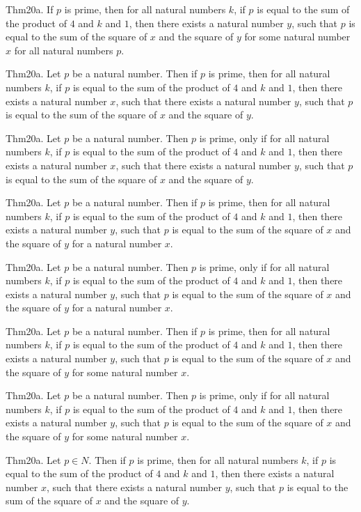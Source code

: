 \documentclass{article}
\begin{document}
Thm20a. If $p$ is prime, then for all natural numbers $k$, if $p$ is equal to the sum of the product of $4$ and $k$ and $1$, then there exists a natural number $y$, such that $p$ is equal to the sum of the square of $x$ and the square of $y$ for some natural number $x$ for all natural numbers $p$.

Thm20a. Let $p$ be a natural number. Then if $p$ is prime, then for all natural numbers $k$, if $p$ is equal to the sum of the product of $4$ and $k$ and $1$, then there exists a natural number $x$, such that there exists a natural number $y$, such that $p$ is equal to the sum of the square of $x$ and the square of $y$.

Thm20a. Let $p$ be a natural number. Then $p$ is prime, only if for all natural numbers $k$, if $p$ is equal to the sum of the product of $4$ and $k$ and $1$, then there exists a natural number $x$, such that there exists a natural number $y$, such that $p$ is equal to the sum of the square of $x$ and the square of $y$.

Thm20a. Let $p$ be a natural number. Then if $p$ is prime, then for all natural numbers $k$, if $p$ is equal to the sum of the product of $4$ and $k$ and $1$, then there exists a natural number $y$, such that $p$ is equal to the sum of the square of $x$ and the square of $y$ for a natural number $x$.

Thm20a. Let $p$ be a natural number. Then $p$ is prime, only if for all natural numbers $k$, if $p$ is equal to the sum of the product of $4$ and $k$ and $1$, then there exists a natural number $y$, such that $p$ is equal to the sum of the square of $x$ and the square of $y$ for a natural number $x$.

Thm20a. Let $p$ be a natural number. Then if $p$ is prime, then for all natural numbers $k$, if $p$ is equal to the sum of the product of $4$ and $k$ and $1$, then there exists a natural number $y$, such that $p$ is equal to the sum of the square of $x$ and the square of $y$ for some natural number $x$.

Thm20a. Let $p$ be a natural number. Then $p$ is prime, only if for all natural numbers $k$, if $p$ is equal to the sum of the product of $4$ and $k$ and $1$, then there exists a natural number $y$, such that $p$ is equal to the sum of the square of $x$ and the square of $y$ for some natural number $x$.

Thm20a. Let $p \in N$. Then if $p$ is prime, then for all natural numbers $k$, if $p$ is equal to the sum of the product of $4$ and $k$ and $1$, then there exists a natural number $x$, such that there exists a natural number $y$, such that $p$ is equal to the sum of the square of $x$ and the square of $y$.
\end{document}
